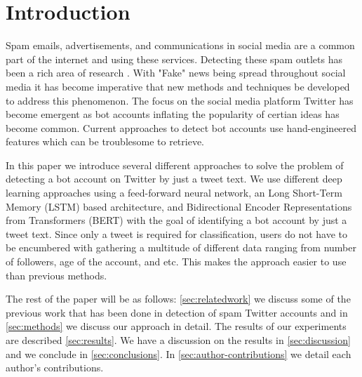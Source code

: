 \section{Introduction}
\label{sec:introduction}

Spam emails, advertisements, and communications in social media are a
common part of the internet and using these services. Detecting these
spam outlets has been a rich area of research
\citep{Cormack:2008:ESF:1454707.1454708,
DBLP:journals/corr/cs-CL-0009009, Androutsopoulos2006LearningTF,
Bickel:2006:DSF:2976456.2976477, Bratko:2006:SFU:1248547.1248644,
Solan:inproceedings, Cresci:2017:PSS:3041021.3055135, fameforsale2015,
INUWADUTSE2018496, FM2793, 8424744}.  With "Fake" news being spread
throughout social media \citep{NBERw25223} it has become imperative
that new methods and techniques be developed to address this
phenomenon. The focus on the social media platform Twitter has become
emergent \citep{8424744, FM2793, INUWADUTSE2018496,
Cresci:2017:PSS:3041021.3055135, fameforsale2015} as bot accounts
inflating the popularity of certian ideas has become common. Current
approaches to detect bot accounts use hand-engineered features which
can be troublesome to retrieve.

In this paper we introduce several different approaches to solve the
problem of detecting a bot account on Twitter by just a tweet text. We use
different deep learning approaches using a feed-forward neural
network, an Long Short-Term Memory (LSTM) based architecture, and
Bidirectional Encoder Representations from Transformers (BERT) with
the goal of identifying a bot account by just a tweet text. Since only a
tweet is required for classification, users do not have to be
encumbered with gathering a multitude of different data ranging from
number of followers, age of the account, and etc. This makes the
approach easier to use than previous methods.

The rest of the paper will be as follows: \cref{sec:relatedwork} we discuss some of the previous work that has been done in detection of spam Twitter accounts and in \cref{sec:methods} we discuss our approach in detail. The results of our experiments are described
\cref{sec:results}. We have a discussion on the results in \cref{sec:discussion} and we conclude in \cref{sec:conclusions}. In \cref{sec:author-contributions} we detail each author's contributions.
